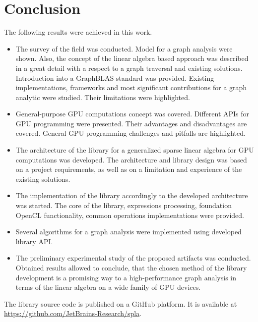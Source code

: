 \section{Conclusion}

The following results were achieved in this work.

\begin{itemize}
    \item The survey of the field was conducted. Model for a graph analysis were shown. Also, the concept of the linear algebra based approach was described in a great detail with a respect to a graph traversal and existing solutions. Introduction into a GraphBLAS standard was provided. Existing implementations, frameworks and most significant contributions for a graph analytic were studied. Their limitations were highlighted. 
    
    \item General-purpose GPU computations concept was covered. Different APIs for GPU programming were presented. Their advantages and disadvantages are covered. General GPU programming challenges and pitfalls are highlighted. 
    
    \item The architecture of the library for a generalized sparse linear algebra for GPU computations was developed. The architecture and library design was based on a project requirements, as well as on a limitation and experience of the existing solutions. 
    
    \item The implementation of the library accordingly to the developed architecture was started. The core of the library, expressions processing, foundation OpenCL functionality, common operations implementations were provided.
    
    \item Several algorithms for a graph analysis were implemented using developed library API.
    
    \item The preliminary experimental study of the proposed artifacts was conducted. Obtained results allowed to conclude, that the chosen method of the library development is a promising way to a high-performance graph analysis in terms of the linear algebra on a wide family of GPU devices. 
\end{itemize}

The library source code is published on a GitHub platform. It is available at \url{https://github.com/JetBrains-Research/spla}.
